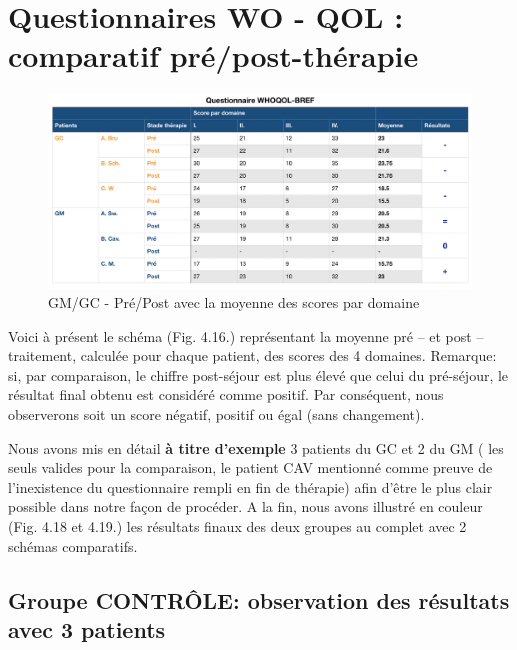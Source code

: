\section{Questionnaires WO - QOL : comparatif pré/post-thérapie }


\begin{figure}
\centering
\includegraphics[width=\linewidth]{images/graphiques/questionnaire_wq.png}
\caption[Questionnaire WHOQOL-BREF]{GM/GC - Pré/Post avec la moyenne des scores par domaine}

\end{figure}
Voici à présent le schéma (Fig. 4.16.) représentant la
moyenne pré -- et post -- traitement, calculée pour chaque patient, des scores
des 4 domaines.
Remarque: si, par comparaison, le chiffre post-séjour est plus élevé
que celui du
pré-séjour, le résultat final obtenu est considéré comme
positif. Par conséquent, nous
observerons soit un score négatif, positif ou égal (sans changement).


Nous avons mis en détail  \textbf{à titre d'exemple } 3 patients du GC et 2 du GM
( les seuls valides pour la comparaison, le patient CAV mentionné comme preuve de l'inexistence du questionnaire rempli en fin de thérapie) afin d'être le plus clair possible
dans notre façon de procéder.
A la fin, nous avons illustré en couleur (Fig. 4.18 et 4.19.) les
résultats finaux des deux groupes au complet avec 2 schémas
comparatifs.
\subsection{Groupe CONTRÔLE: observation des résultats avec 3 patients}


